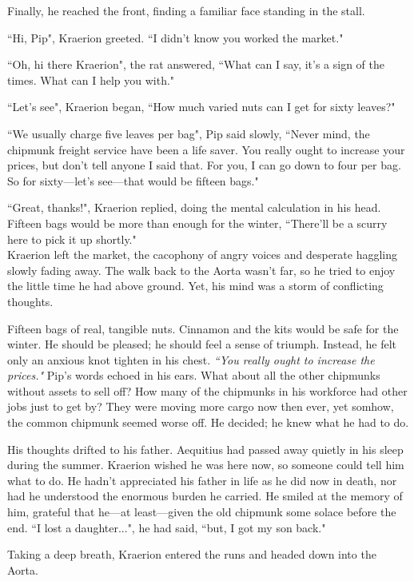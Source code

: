 Finally, he reached the front, finding a familiar face standing in the stall.

``Hi, Pip", Kraerion greeted. ``I didn't know you worked the market."

``Oh, hi there Kraerion", the rat answered, ``What can I say, it's a sign of the times. What can I help you with."

``Let's see", Kraerion began, ``How much varied nuts can I get for sixty leaves?"

``We usually charge five leaves per bag", Pip said slowly, ``Never mind, the chipmunk freight service have been a life saver. You really ought to increase your prices, but don't tell anyone I said that. For you, I can go down to four per bag. So for sixty---let's see---that would be fifteen bags."

``Great, thanks!", Kraerion replied, doing the mental calculation in his head. Fifteen bags would be more than enough for the winter, ``There'll be a scurry here to pick it up shortly."\\

Kraerion left the market, the cacophony of angry voices and desperate haggling slowly fading away. The walk back to the Aorta wasn't far, so he tried to enjoy the little time he had above ground. Yet, his mind was a storm of conflicting thoughts.

Fifteen bags of real, tangible nuts. Cinnamon and the kits would be safe for the winter. He should be pleased; he should feel a sense of triumph. Instead, he felt only an anxious knot tighten in his chest.
\textit{``You really ought to increase the prices."} Pip's words echoed in his ears. What about all the other chipmunks without assets to sell off? How many of the chipmunks in his workforce had other jobs just to get by? They were moving more cargo now then ever, yet somhow, the common chipmunk seemed worse off. He decided; he knew what he had to do.

His thoughts drifted to his father. Aequitius had passed away quietly in his sleep during the summer. Kraerion wished he was here now, so someone could tell him what to do. He hadn't appreciated his father in life as he did now in death, nor had he understood the enormous burden he carried. He smiled at the memory of him, grateful that he---at least---given the old chipmunk some solace before the end. ``I lost a daughter...", he had said, ``but, I got my son back."

Taking a deep breath, Kraerion entered the runs and headed down into the Aorta.

